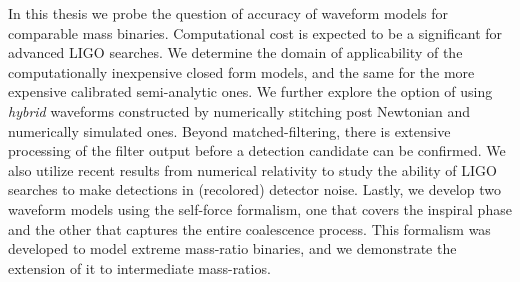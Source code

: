In this thesis we probe the question of accuracy of waveform models for 
comparable mass binaries. Computational cost is expected to be a significant
for advanced LIGO searches. We determine the domain of applicability of the
computationally inexpensive closed form models, and the same for the more 
expensive calibrated semi-analytic ones. We further explore the option of 
using {\it hybrid} waveforms constructed by numerically stitching post 
Newtonian and numerically simulated ones. Beyond matched-filtering, there 
is extensive processing of the filter output before a detection candidate can
be confirmed. We also utilize recent results from numerical relativity to study
the ability of LIGO searches to make detections in (recolored) detector noise.
Lastly, we develop two waveform models using the self-force formalism, one 
that covers the inspiral phase and the other that captures the entire 
coalescence process. This formalism was developed to model extreme mass-ratio
binaries, and we demonstrate the extension of it to intermediate mass-ratios.
